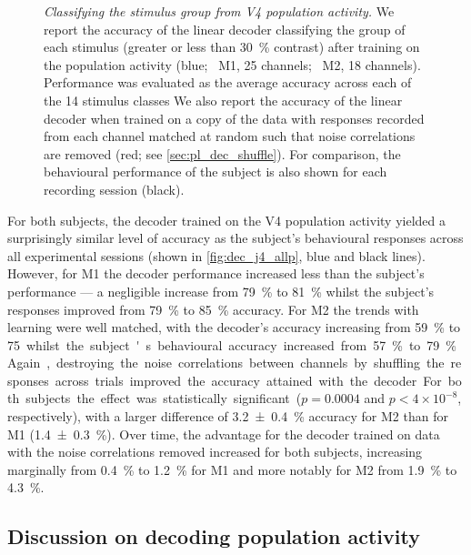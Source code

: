 \begin{figure}[htbp]
{    }
    \hspace*{\fill}
    \caption{%
    \textit{Classifying the stimulus group from \ac{V4} population activity.}
    We report the accuracy of the linear decoder classifying the group of each stimulus (greater or less than \SI{30}{\percent} contrast) after training on the population activity (blue; \protect{}~\ac{M1}, \num{25} channels; \protect{}~\ac{M2}, \num{18} channels).
    Performance was evaluated as the average accuracy across each of the \num{14} stimulus classes
    We also report the accuracy of the linear decoder when trained on a copy of the data with responses recorded from each channel matched at random such that noise correlations are removed (red; see \autoref{sec:pl_dec_shuffle}).
    For comparison, the behavioural performance of the subject is also shown for each recording session (black).
}
    \label{fig:dec_all_v4}
\end{figure}

For both subjects, the decoder trained on the \ac{V4} population activity yielded a surprisingly similar level of accuracy as the subject's behavioural responses across all experimental sessions (shown in \autoref{fig:dec_j4_allp}, blue and black lines).
However, for \ac{M1} the decoder performance increased less than the subject's performance --- a negligible increase from \SI{79}{\percent} to \SI{81}{\percent} whilst the subject's responses improved from \SI{79}{\percent} to \SI{85}{\percent} accuracy.
For \ac{M2} the trends with learning were well matched, with the decoder's accuracy increasing from \SI{59}{\percent} to \SI{75} whilst the subject's behavioural accuracy increased from \SI{57}{\percent} to \SI{79}{\percent}.

Again, destroying the noise correlations between channels by shuffling the responses across trials improved the accuracy attained with the decoder.
For both subjects the effect was statistically significant ($p=0.0004$ and $p < 4 \times 10^{-8}$, respectively), with a larger difference of \SI{+3.2\pm0.4}{\percent} accuracy for \ac{M2} than for \ac{M1} (\SI{+1.4\pm0.3}{\percent}).
Over time, the advantage for the decoder trained on data with the noise correlations removed increased for both subjects, increasing marginally from \SI{0.4}{\percent} to \SI{1.2}{\percent} for \ac{M1} and more notably for \ac{M2} from \SI{1.9}{\percent} to \SI{4.3}{\percent}.


\subsection{Discussion on decoding population activity}

